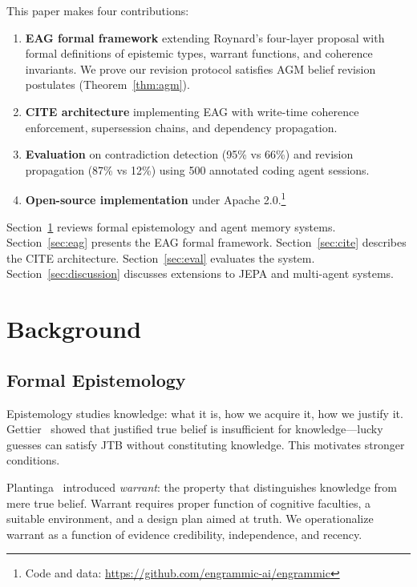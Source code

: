 \documentclass[11pt,letterpaper]{article}
\begin{document}
This paper makes four contributions:
\begin{enumerate}[noitemsep]
    \item \textbf{EAG formal framework} extending Roynard's four-layer proposal with formal definitions of epistemic types, warrant functions, and coherence invariants. We prove our revision protocol satisfies AGM belief revision postulates (Theorem~\ref{thm:agm}).
    \item \textbf{CITE architecture} implementing EAG with write-time coherence enforcement, supersession chains, and dependency propagation.
    \item \textbf{Evaluation} on contradiction detection (95\% vs 66\%) and revision propagation (87\% vs 12\%) using 500 annotated coding agent sessions.
    \item \textbf{Open-source implementation} under Apache 2.0.\footnote{Code and data: \url{https://github.com/engrammic-ai/engrammic}}
\end{enumerate}

Section~\ref{sec:background} reviews formal epistemology and agent memory systems. Section~\ref{sec:eag} presents the EAG formal framework. Section~\ref{sec:cite} describes the CITE architecture. Section~\ref{sec:eval} evaluates the system. Section~\ref{sec:discussion} discusses extensions to JEPA and multi-agent systems.

\section{Background}
\label{sec:background}

\subsection{Formal Epistemology}

Epistemology studies knowledge: what it is, how we acquire it, how we justify it. Gettier~\cite{gettier1963} showed that justified true belief is insufficient for knowledge---lucky guesses can satisfy JTB without constituting knowledge. This motivates stronger conditions.

Plantinga~\cite{plantinga1993} introduced \textit{warrant}: the property that distinguishes knowledge from mere true belief. Warrant requires proper function of cognitive faculties, a suitable environment, and a design plan aimed at truth. We operationalize warrant as a function of evidence credibility, independence, and recency.
\end{document}
